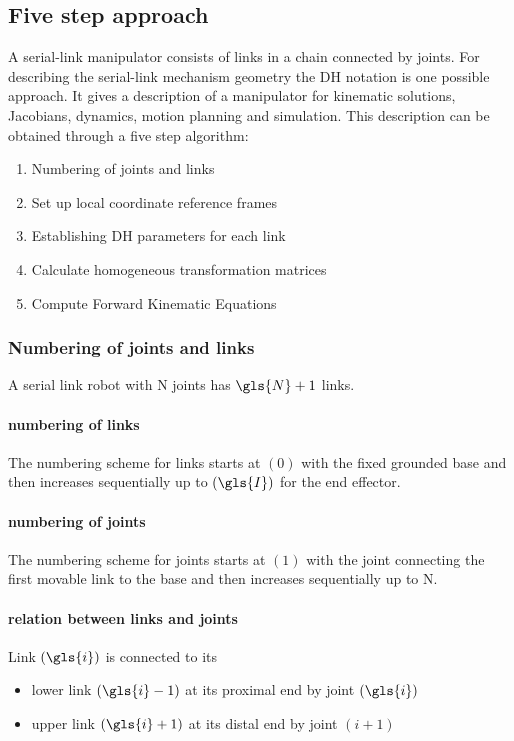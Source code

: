 \subsection{Five step approach}
A serial-link manipulator consists of links in a chain connected by joints. 
For describing the serial-link mechanism geometry the \acrfull{DH} notation is one possible approach.
It gives a description of a manipulator for kinematic solutions, Jacobians, dynamics, motion planning and simulation. 
This description can be obtained through a five step algorithm:\cite{ConstantinForwardKA}

\begin{enumerate}
	\item Numbering of joints and links
	\item Set up local coordinate reference frames
	\item Establishing \ac{DH} parameters for each link
	\item Calculate homogeneous transformation matrices
	\item Compute Forward Kinematic Equations
\end{enumerate}

\subsubsection{Numbering of joints and links} \label{sec:NumJointLink}
A serial link robot with \gls{N} joints has $\gls{N}+1$ links. 

\paragraph{numbering of links}
The numbering scheme for links starts at $(0)$ with the fixed grounded base and then increases sequentially up to $(\gls{I})$ for the end effector.

\paragraph{numbering of joints}
The numbering scheme for joints starts at $(1)$ with the joint connecting the first movable link to the base and then increases sequentially up to \gls{N}.

\paragraph{relation between links and joints}
Link $(\gls{i})$ is connected to its 
\begin{itemize}
	\item lower link $(\gls{i}-1)$ at its proximal \cite{proxdist} end by joint $(\gls{i})$
	\item upper link $(\gls{i}+1)$ at its distal \cite{proxdist} end by joint $(i+1)$
\end{itemize}



